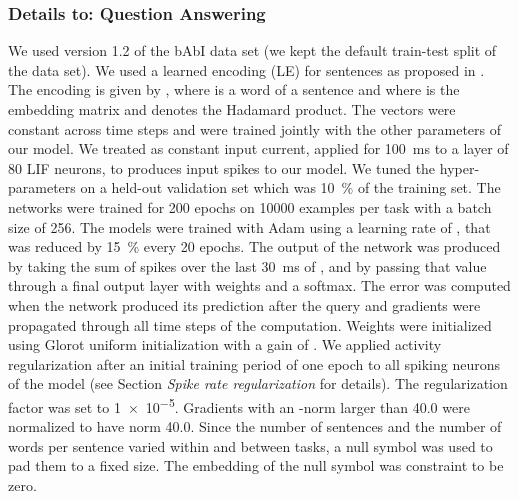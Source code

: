 \documentclass{article}
\begin{document}
\subsubsection*{Details to: Question Answering}
We used version 1.2 of the bAbI data set (we kept the default train-test split of the data set). We used a learned encoding (LE) for sentences as proposed in \cite{henaff2017tracking}. The encoding is given by , where  is a word of a sentence  and where  is the embedding matrix and  denotes the Hadamard product. The vectors  were constant across time steps and were trained jointly with the other parameters of our model. We treated  as constant input current, applied for \SI{100}{ms} to a layer of \num{80} \gls{LIF} neurons, to produces input spikes to our model. We tuned the hyper-parameters on a held-out validation set which was \SI{10}{\percent} of the training set. The networks were trained for \num{200} epochs on \num{10000} examples per task with a batch size of \num{256}. The models were trained with Adam \cite{kingma2014adam} using a learning rate of , that was reduced by \SI{15}{\percent} every \num{20} epochs. The output of the network was produced by taking the sum of spikes over the last \SI{30}{ms} of , and by passing that value through a final output layer with weights  and a softmax. The error was computed when the network produced its prediction after the query and gradients were propagated through all time steps of the computation. Weights were initialized using Glorot uniform initialization \cite{glorot2010understanding} with a gain of . We applied  activity regularization after an initial training period of one epoch to all spiking neurons of the model (see Section \emph{Spike rate regularization} for details). The regularization factor  was set to \num{1e-5}. Gradients with an -norm larger than \num{40.0} were normalized to have norm \num{40.0}. Since the number of sentences and the number of words per sentence varied within and between tasks, a null symbol was used to pad them to a fixed size. The embedding of the null symbol was constraint to be zero.
\end{document}
